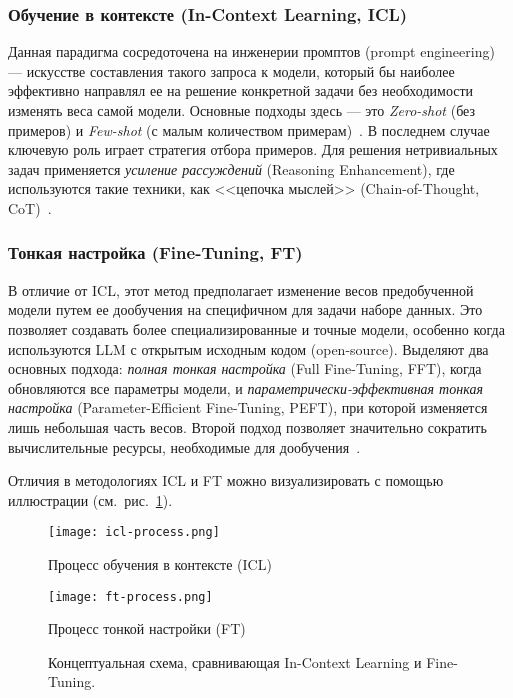 \subsubsection{Обучение в контексте (In-Context Learning, ICL)}

Данная парадигма
сосредоточена на инженерии промптов (prompt engineering) --- искусстве составления
такого запроса к модели, который бы наиболее эффективно направлял ее на решение конкретной
задачи без необходимости изменять веса самой модели. Основные подходы
здесь --- это \textit{Zero-shot} (без примеров) и \textit{Few-shot}
(с малым количеством примерам)~\cite{zhuLargeLanguageModel2024}. В последнем случае ключевую
роль играет стратегия отбора примеров.
Для решения нетривиальных задач применяется \textit{усиление рассуждений}
(Reasoning Enhancement), где используются такие техники, как <<цепочка мыслей>>
(Chain-of-Thought, CoT)~\cite{zhuLargeLanguageModel2024,
	huangExploringLandscapeTexttoSQL2025}.

\subsubsection{Тонкая настройка (Fine-Tuning, FT)}

В отличие от ICL, этот метод предполагает
изменение весов предобученной модели путем ее дообучения на специфичном для задачи наборе данных.
Это позволяет создавать более специализированные и точные модели, особенно когда
используются LLM с открытым исходным кодом (open-source). Выделяют два основных
подхода: \textit{полная тонкая настройка} (Full Fine-Tuning, FFT), когда обновляются
все параметры модели, и \textit{параметрически-эффективная тонкая настройка}
(Parameter-Efficient Fine-Tuning, PEFT), при которой изменяется лишь небольшая
часть весов.
Второй подход позволяет значительно сократить вычислительные ресурсы, необходимые для
дообучения~\cite{huangExploringLandscapeTexttoSQL2025}.

Отличия в методологиях ICL и FT можно визуализировать с помощью иллюстрации (см.~рис.~\ref{fig:icl-vs-ft}).

\begin{figure}[h]
	\centering
	\begin{subcaptiongroup}
		\texttt{[image: icl-process.png]}
		\caption{Процесс обучения в контексте (ICL)}
		\label{fig:icl-process}
		\texttt{[image: ft-process.png]}
		\caption{Процесс тонкой настройки (FT)}
		\label{fig:ft-process}
	\end{subcaptiongroup}
	\captionsetup{subrefformat=parens}
	\caption{Концептуальная схема, сравнивающая In-Context Learning и Fine-Tuning.}
	\label{fig:icl-vs-ft}
\end{figure}

